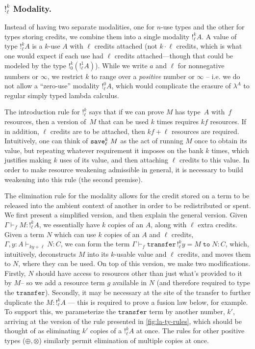 \subsubsection{$!^k_\ell$ Modality.}
Instead of having two separate modalities, one for $n$-use types and the
other for types storing credits, we combine them into a single modality
$!^k_\ell A$. A value of type $!^k_\ell A$ is a $k$-use $A$ with $\ell$
credits attached (not $k \cdot \ell$ credits, which is what one would
expect if each use had $\ell$ credits attached---though that could be
modeled by the type $!^k_0 (!^1_\ell A)$).  While we write $a$ and
$\ell$ for nonnegative numbers or $\infty$, we restrict $k$ to range
over a \emph{positive} number or $\infty$ -- i.e. we do not allow a
``zero-use'' modality $!^0_\ell A$, which would complicate the
erasure of $\lambda^A$ to regular simply typed lambda calculus.

The introduction rule for $!^k_\ell$ says that if we can prove $M$ has
type~$A$ with~$f$ resources, then a version of~$M$ that can be used $k$
times requires $kf$ resources.  If in addition, $\ell$ credits are to be
attached, then $kf+\ell$ resources are required.  Intuitively, one can
think of $\texttt{save}^{k}_{\ell} \; M$ as the act of running $M$ once to obtain its
value, but repeating whatever requirement it imposes on the bank $k$
times, which justifies making $k$ uses of its value, and then attaching
$\ell$ credits to this value.  In order to make resource weakening
admissible in general, it is necessary to build weakening into this
rule (the second premise).

The elimination rule for the modality allows for the credit stored
on a term to be released into the ambient context of another in order to
be redistributed or spent. We first present a simplified version, and
then explain the general version. Given $\Gamma \vdash_f M : !^k_\ell
A$, we essentially have $k$ copies of an $A$, along with $\ell$ extra
credits. Given a term $N$ which can use $k$ copies of an $A$ and $\ell$
credits, $\Gamma,y : A \vdash_{ky + \ell} N : C$, we can form the term
$\Gamma \vdash_{f} \texttt{transfer} \, !^k_\ell y = M \; \texttt{to} \;
N : C$, which, intuitively, deconstructs $M$ into its $k$-usable value
and $\ell$ credits, and moves them to $N$, where they can be used. On
top of this version, we make two modifications. Firstly, $N$ should have
access to resources other than just what's provided to it by $M$-- so we
add a resource term $g$ available in $N$ (and
therefore required to type the
$\texttt{transfer}$). Secondly, it may be necessary at the site of the
transfer to further duplicate the $M : !^k_\ell A$ --- this is required to
prove a fusion law below, for example.  To support this,
we parameterize the $\texttt{transfer}$ term
by another number, $k'$, arriving at the version of the rule
presented in \autoref{fig:la-ty-rules}, which should be thought of as
eliminating $k'$ copies of a $!^k_\ell A$ at once.
The rules for other positive types ($\oplus,\otimes$) similarly permit elimination of multiple copies at
once.


